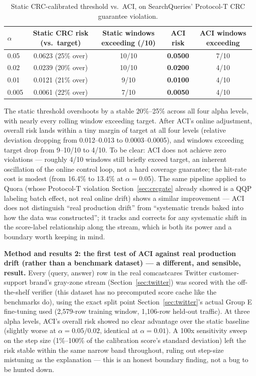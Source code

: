 \documentclass[11pt]{article}
\newenvironment{fittab}{\begin{lrbox}{\fittabbox}}{\end{lrbox}%
  \ifdim\wd\fittabbox>\linewidth\resizebox{\linewidth}{!}{\usebox{\fittabbox}}\else\usebox{\fittabbox}\fi}
\begin{document}
\begin{table}[h]
\centering
\small
\begin{fittab}\begin{tabular}{@{}lcccc@{}}
\toprule
$\alpha$ & \textbf{Static CRC risk (vs.\ target)} & \textbf{Static windows exceeding (/10)} & \textbf{ACI risk} & \textbf{ACI windows exceeding} \\
\midrule
0.05 & 0.0623 (25\% over) & 10/10 & \textbf{0.0500} & 7/10 \\
0.02 & 0.0239 (20\% over) & 10/10 & \textbf{0.0200} & 4/10 \\
0.01 & 0.0121 (21\% over) & 9/10 & \textbf{0.0100} & 4/10 \\
0.005 & 0.0061 (22\% over) & 7/10 & \textbf{0.0050} & 4/10 \\
\bottomrule
\end{tabular}\end{fittab}
\caption{Static CRC-calibrated threshold vs.\ ACI, on SearchQueries' Protocol-T CRC guarantee violation.}
\end{table}

The static threshold overshoots by a stable 20\%--25\% across all four alpha levels, with nearly every rolling window exceeding target. After ACI's online adjustment, overall risk lands within a tiny margin of target at all four levels (relative deviation dropping from 0.012--0.013 to 0.0003--0.0005), and windows exceeding target drop from 9--10/10 to 4/10. To be clear: ACI does not achieve zero violations --- roughly 4/10 windows still briefly exceed target, an inherent oscillation of the online control loop, not a hard coverage guarantee; the hit-rate cost is modest (from 16.4\% to 13.4\% at $\alpha=0.05$). The same pipeline applied to Quora (whose Protocol-T violation Section~\ref{sec:crcgate} already showed is a QQP labeling batch effect, not real online drift) shows a similar improvement --- ACI does not distinguish ``real production drift'' from ``systematic trends baked into how the data was constructed''; it tracks and corrects for any systematic shift in the score-label relationship along the stream, which is both its power and a boundary worth keeping in mind.

\textbf{Method and results 2: the first test of ACI against real production drift (rather than a benchmark dataset) --- a different, and sensible, result.} Every (query, answer) row in the real comcastcares Twitter customer-support brand's gray-zone stream (Section~\ref{sec:twitter}) was scored with the off-the-shelf verifier (this dataset has no precomputed score cache like the benchmarks do), using the exact split point Section~\ref{sec:twitter}'s actual Group E fine-tuning used (2,579-row training window, 1,106-row held-out traffic). At three alpha levels, ACI's overall risk showed no clear advantage over the static baseline (slightly worse at $\alpha=0.05/0.02$, identical at $\alpha=0.01$). A 100x sensitivity sweep on the step size (1\%--100\% of the calibration score's standard deviation) left the risk stable within the same narrow band throughout, ruling out step-size mistuning as the explanation --- this is an honest boundary finding, not a bug to be hunted down.
\end{document}
